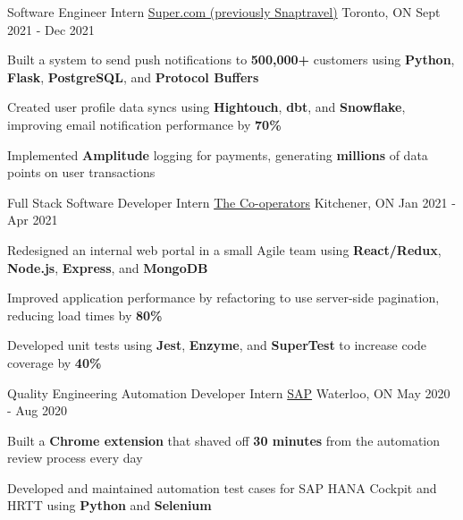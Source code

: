 \begin{cventries}
  \cventry
    {Software Engineer Intern} %
    {\href{https://www.super.com/}{Super.com (previously Snaptravel)}} %
    {Toronto, ON} %
    {Sept 2021 - Dec 2021} %
    {
      \begin{cvitems} %
      \item {Built a system to send push notifications to \textbf{500,000+} customers using \textbf{Python}, \textbf{Flask}, \textbf{PostgreSQL}, and \textbf{Protocol Buffers}}
      \item {Created user profile data syncs using \textbf{Hightouch}, \textbf{dbt}, and \textbf{Snowflake}, improving email notification performance by \textbf{70\%}}
      \item {Implemented \textbf{Amplitude} logging for payments, generating \textbf{millions} of data points on user transactions}
      \end{cvitems}
    }

  \cventry
    {Full Stack Software Developer Intern} %
    {\href{https://www.cooperators.ca/}{The Co-operators}} %
    {Kitchener, ON} %
    {Jan 2021 - Apr 2021} %
    {
      \begin{cvitems} %
      \item {Redesigned an internal web portal in a small Agile team using \textbf{React/Redux}, \textbf{Node.js}, \textbf{Express}, and \textbf{MongoDB}}
      \item {Improved application performance by refactoring to use server-side pagination, reducing load times by \textbf{80\%}}
      \item {Developed unit tests using \textbf{Jest}, \textbf{Enzyme}, and \textbf{SuperTest} to increase code coverage by \textbf{40\%}}
      \end{cvitems}
    }
    
  \cventry
    {Quality Engineering Automation Developer Intern} %
    {\href{https://www.sap.com/canada/index.html}{SAP}} %
    {Waterloo, ON} %
    {May 2020 - Aug 2020} %
    {
      \begin{cvitems} %
      \item {Built a \textbf{Chrome extension} that shaved off \textbf{30 minutes} from the automation review process every day}
      \item {Developed and maintained automation test cases for SAP HANA Cockpit and HRTT using \textbf{Python} and \textbf{Selenium}}
      \end{cvitems}
    }
       
\end{cventries}
